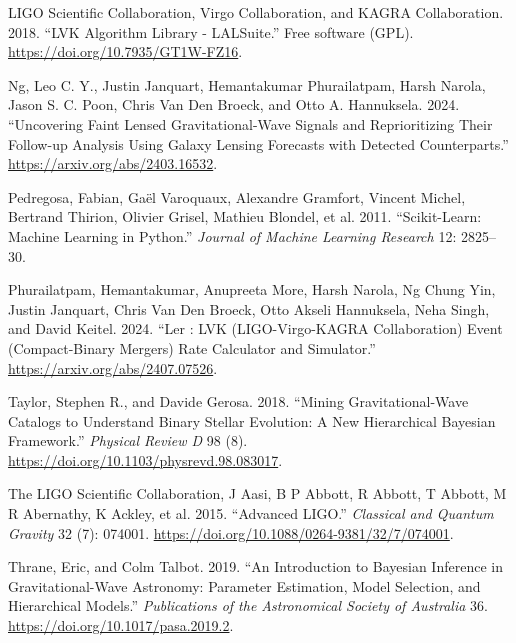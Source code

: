 \documentclass[10pt,a4paper,onecolumn]{article}
\newlength{\cslhangindent}
\newenvironment{CSLReferences}[3] %
 {%
  \setlength{\parindent}{0pt}
  \ifodd #1 \everypar{\setlength{\hangindent}{\cslhangindent}}\ignorespaces\fi
  \ifnum #2 > 0
  \setlength{\parskip}{#2\baselineskip}
  \fi
 }%
 {}
\begin{document}
\begin{CSLReferences}{1}{0}
\bibitem[\citeproctext]{ref-lalsuite}
LIGO Scientific Collaboration, Virgo Collaboration, and KAGRA
Collaboration. 2018. {``{LVK} {A}lgorithm {L}ibrary - {LALS}uite.''}
Free software (GPL). \url{https://doi.org/10.7935/GT1W-FZ16}.

Ng, Leo C. Y., Justin Janquart, Hemantakumar Phurailatpam, Harsh Narola,
Jason S. C. Poon, Chris Van Den Broeck, and Otto A. Hannuksela. 2024.
{``Uncovering Faint Lensed Gravitational-Wave Signals and Reprioritizing
Their Follow-up Analysis Using Galaxy Lensing Forecasts with Detected
Counterparts.''} \url{https://arxiv.org/abs/2403.16532}.

Pedregosa, Fabian, Gaël Varoquaux, Alexandre Gramfort, Vincent Michel,
Bertrand Thirion, Olivier Grisel, Mathieu Blondel, et al. 2011.
{``Scikit-Learn: Machine Learning in {P}ython.''} \emph{Journal of
Machine Learning Research} 12: 2825--30.

Phurailatpam, Hemantakumar, Anupreeta More, Harsh Narola, Ng Chung Yin,
Justin Janquart, Chris Van Den Broeck, Otto Akseli Hannuksela, Neha
Singh, and David Keitel. 2024. {``Ler : LVK (LIGO-Virgo-KAGRA
Collaboration) Event (Compact-Binary Mergers) Rate Calculator and
Simulator.''} \url{https://arxiv.org/abs/2407.07526}.

Taylor, Stephen R., and Davide Gerosa. 2018. {``Mining
Gravitational-Wave Catalogs to Understand Binary Stellar Evolution: A
New Hierarchical Bayesian Framework.''} \emph{Physical Review D} 98 (8).
\url{https://doi.org/10.1103/physrevd.98.083017}.

The LIGO Scientific Collaboration, J Aasi, B P Abbott, R Abbott, T
Abbott, M R Abernathy, K Ackley, et al. 2015. {``Advanced LIGO.''}
\emph{Classical and Quantum Gravity} 32 (7): 074001.
\url{https://doi.org/10.1088/0264-9381/32/7/074001}.

Thrane, Eric, and Colm Talbot. 2019. {``An Introduction to Bayesian
Inference in Gravitational-Wave Astronomy: Parameter Estimation, Model
Selection, and Hierarchical Models.''} \emph{Publications of the
Astronomical Society of Australia} 36.
\url{https://doi.org/10.1017/pasa.2019.2}.

\end{CSLReferences}
\end{document}
